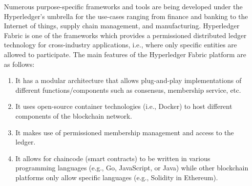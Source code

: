 
Numerous purpose-specific frameworks and tools are being developed under the Hyperledger's umbrella for the use-cases ranging from finance and banking to the Internet of things, supply chain management, and manufacturing.
Hyperledger Fabric is one of the frameworks which provides a permissioned distributed ledger technology for cross-industry applications, i.e., where only specific entities are allowed to participate. The main features of the Hyperledger Fabric platform are as follows:

\begin{enumerate}
    \item It has a modular architecture that allows plug-and-play implementations of different functions/components such as consensus, membership service, etc.
    \item It uses open-source container technologies (i.e., Docker) to host different components of the blockchain network.
    \item It makes use of permissioned membership management and access to the ledger.
    \item It allows for chaincode (smart contracts) to be written in various programming languages (e.g., Go, JavaScript, or Java) while other blockchain platforms only allow specific languages (e.g., Solidity in Ethereum).
\end{enumerate}



